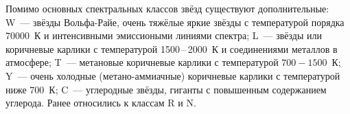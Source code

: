 Помимо основных спектральных классов звёзд существуют дополнительные: W~--- звёзды Вольфа-Райе, очень тяжёлые яркие звёзды с температурой порядка $70000$~К и интенсивными эмиссиоными линиями спектра; L~--- звёзды или коричневые карлики с температурой 1500\,--\,2000~К и соединениями металлов в атмосфере; T~--- метановые коричневые карлики с температурой $700 - 1500$~К; Y~---  очень холодные (метано-аммиачные) коричневые карлики с температурой ниже $700$~К; C~--- углеродные звёзды, гиганты с повышенным содержанием углерода. Ранее относились к классам R и N.
